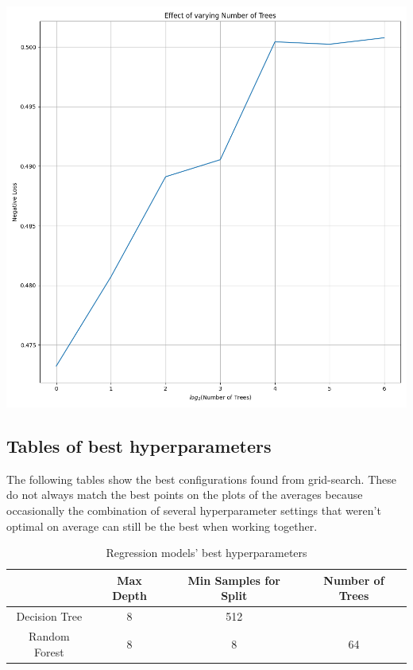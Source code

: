 \documentclass[12pt, letterpaper]{article}
\begin{document}
\includegraphics[scale=\myscale]{random_forest_classifier_Number of Trees.png}

\subsection{Tables of best hyperparameters}

The following tables show the best configurations found from grid-search. These do not always match the best points on the plots of the averages because occasionally the combination of several hyperparameter settings that weren't optimal on average can still be the best when working together.

\begin{table}[H]
\centering
\caption{Regression models' best hyperparameters}
\label{reg_table}
\begin{tabular}{c|c|c|c} %
                & Max Depth     & Min Samples for Split & Number of Trees \\ \hline
Decision Tree   & 8             & 512                   &   \\
Random Forest   & 8             & 8                     & 64 \\
\end{tabular}
\end{table}
\end{document}
